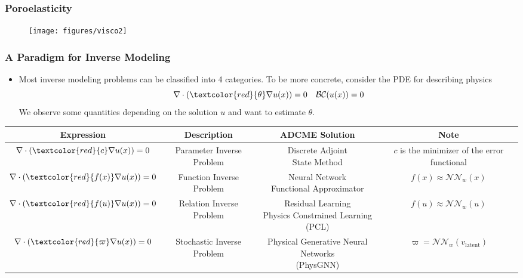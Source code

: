 \documentclass[usenames,dvipsnames]{beamer}
\begin{document}
\begin{frame}
	\frametitle{Poroelasticity}
	\begin{figure}[hbt]
		\texttt{[image: figures/visco2]}
	\end{figure}
	
\end{frame}


\begin{frame}
\frametitle{A Paradigm for Inverse Modeling}
\begin{itemize}
	\item Most inverse modeling problems can be classified into 4 categories. To be more concrete, consider the PDE for describing physics
	\begin{equation}
		\nabla \cdot (\textcolor{red}{\theta} \nabla u(x)) = 0\quad \mathcal{B}\mathcal{C}(u(x)) = 0
	\end{equation}
	We observe some quantities depending on the solution $u$ and want to estimate $\theta$.
\end{itemize}
{
	\tiny
	\begin{table}[]
		\begin{tabular}{@{}cccc@{}}
			\toprule
			Expression                                       & Description                & ADCME Solution                         & Note                                     \\ \midrule
			$\nabla \cdot (\textcolor{red}{c} \nabla u(x)) = 0$ & Parameter Inverse Problem  & \makecell{Discrete Adjoint\\ State Method}          & \makecell{$c$ is the minimizer of\\ the error functional }                     \\ \hline
			$\nabla \cdot (\textcolor{red}{f(x)} \nabla u(x)) = 0$ & Function Inverse Problem & \makecell{Neural Network \\ Functional Approximator} & $f(x) \approx \mathcal{NN}_{w}(x)$             \\ \hline
			$\nabla \cdot (\textcolor{red}{f(u)} \nabla u(x)) = 0$ & Relation Inverse Problem   & \makecell{Residual Learning\\ Physics Constrained Learning (PCL)}        & $f(u) \approx \mathcal{NN}_{w}(u)$             \\ \hline
			$\nabla \cdot (\textcolor{red}{\varpi} \nabla u(x)) = 0$ & Stochastic Inverse Problem & \makecell{Physical Generative Neural Networks \\ (PhysGNN)}         & $\varpi = \mathcal{NN}_w(v_{\mathrm{latent}})$ \\ \bottomrule
		\end{tabular}
	\end{table}
}
\end{frame}
\end{document}
